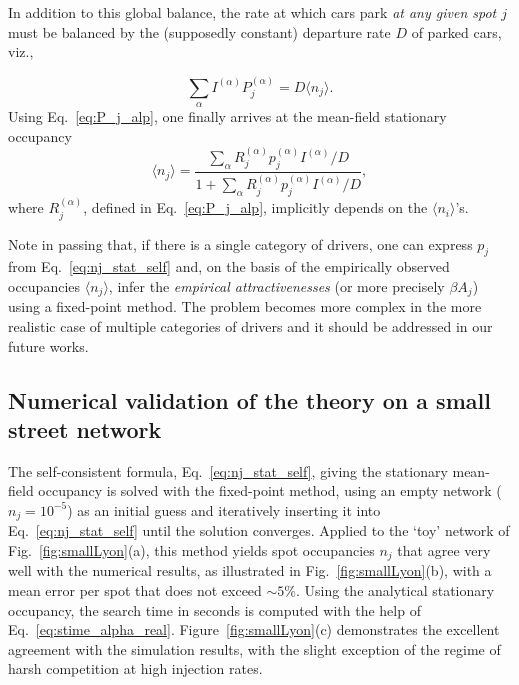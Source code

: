 \documentclass[trsc,reprint]{informs3}
\newcommand{\alp}{^{(\alpha)}}
\newcommand{\AN}[1]{#1}
\begin{document}
In addition to this global balance, the rate at which cars park \emph{at any given spot $j$} must be
balanced by the (supposedly constant) departure rate $D$ of parked cars, viz.,

\begin{equation}
      \sum_{\alpha} I\alp P_j\alp = D \langle n_j \rangle.
\end{equation}
Using Eq.~\ref{eq:P_j_alp}, one finally arrives at the mean-field stationary occupancy
\begin{equation}
      \langle n_j \rangle = \frac{ \sum_\alpha R_j\alp p_j\alp I\alp / D }{1+ \sum_\alpha  R_j\alp  p_j\alp  I\alp / D},
\label{eq:nj_stat_self}
\end{equation}
where $R_j\alp$, defined in Eq.~\ref{eq:P_j_alp}, implicitly depends on the $\langle n_i \rangle$'s.

Note in passing that, if there is a single category of drivers, one can express $p_j$ from Eq.~\ref{eq:nj_stat_self} and, on the basis of the empirically
observed occupancies $\langle n_j \rangle$, infer the \emph{empirical attractivenesses} (or more precisely $\beta A_j$) using a fixed-point method. The problem becomes more complex in the more realistic case of multiple categories of drivers and it \AN{should} be addressed in our future works.



\subsection{Numerical validation of the theory on a small street network}

The self-consistent formula, Eq.~\ref{eq:nj_stat_self}, giving the stationary mean-field occupancy is solved with the fixed-point method, using an empty network ($n_j=10^{-5}$) as an initial guess and
iteratively inserting it into Eq.~\ref{eq:nj_stat_self} until the solution converges. 
Applied to the `toy' network of Fig.~\ref{fig:smallLyon}(a), this method yields spot occupancies $n_j$ that
agree very well with the numerical results, as illustrated in Fig.~\ref{fig:smallLyon}(b), with a mean error per spot that does not exceed $\sim5\%$.
Using the analytical stationary occupancy, the search time in seconds is computed with the help of Eq.~\ref{eq:stime_alpha_real}. Figure~\ref{fig:smallLyon}(c) demonstrates the excellent agreement with the simulation results, with the slight exception of the regime of harsh competition at high injection rates.
\end{document}
